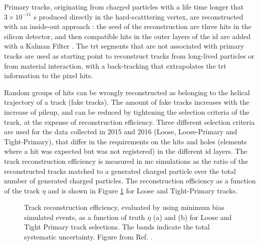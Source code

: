 Primary tracks, originating from charged particles with a life time longer that $3 \times 10^{-11}$ s produced directly in the hard-scatttering vertex, are reconstructed with an inside-out approach \cite{Cornelissen:1020106}: the seed of the reconstruction are three hits in the silicon detector, and then compatible hits in the outer layers of the \gls{id} are added with a Kalman Filter \cite{citeulike:347166,Fruhwirth:1987fm}. The \gls{trt} segments that are not associated with primary tracks are used as starting point to reconstruct tracks from long-lived particles or from material interaction, with a back-tracking that extrapolates the \gls{trt} information to the pixel hits. 

Random groups of hits can be wrongly reconstructed as belonging to the helical trajectory of a track (fake tracks). The amount of fake tracks increases with the increase of pileup, and can be reduced by tightening the selection criteria of the track, at the expense of reconstruction efficiency. Three different selection criteria are used for the data collected in 2015 and 2016 (Loose, Loose-Primary and Tight-Primary), that differ in the requirements on the hits and holes (elements where a hit was expected but was not registered) in the different \gls{id} layers. The track reconstruction efficiency is measured in \gls{mc} simulations as the ratio of the reconstructed tracks matched to a generated charged particle over the total number of generated charged particles. The reconstruction efficiency as a function of the track $\eta$ and \pt is shown in Figure \ref{fig:obj:tracks} for Loose and Tight-Primary tracks.
 
\begin{figure}[ht]
\centering
{}
\caption{Track reconstruction efficiency, evaluated by using minimum bias simulated events, as a function of truth $\eta$ (a) and \pt (b) for Loose and Tight Primary track selections. The bands indicate the total systematic uncertainty. Figure from Ref. \cite{ATL-PHYS-PUB-2015-051}.}
\label{fig:obj:tracks}
\end{figure}

